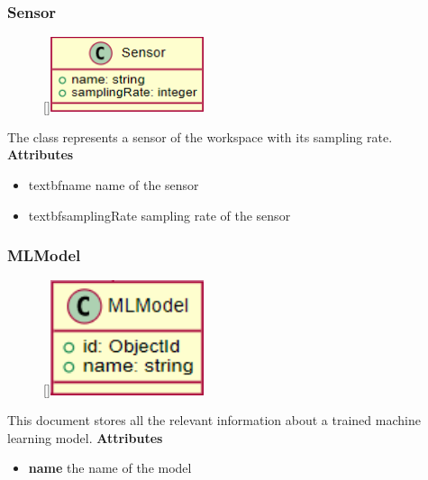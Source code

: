 \subsubsection{Sensor}
\begin{figure}
    \raisebox{0pt}[\dimexpr{}\baselineskip\relax]{\includegraphics[width=4.5cm]{classes/model-management/3.png}}
\end{figure} 
\par
The class represents a sensor of the workspace with its sampling rate.
\newline
\newline
\textbf{Attributes}
\begin{itemize}
    \item textbf{name} name of the sensor
    \item textbf{samplingRate} sampling rate of the sensor
\end{itemize}

\subsubsection{MLModel}
\begin{figure}
    \raisebox{0pt}[\dimexpr{}\baselineskip\relax]{\includegraphics[width=4.5cm]{classes/model-management/4.png}}
\end{figure} 
\par
This document stores all the relevant information about a trained machine learning model.
\newline
\newline
\textbf{Attributes}
\begin{itemize}
    \item \textbf{name} the name of the model
\end{itemize}

